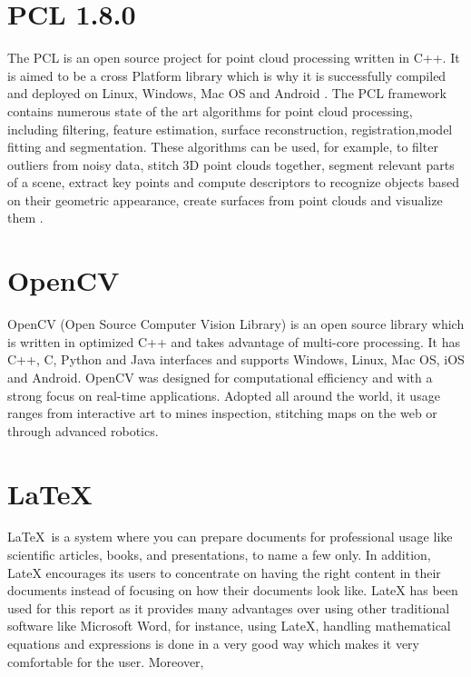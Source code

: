 \documentclass[a4paper]{report}
\begin{document}
\section{PCL 1.8.0}
The PCL is an open source project for point cloud processing written in C++. It is aimed to be a cross Platform library which is why it is successfully compiled and deployed on Linux, Windows, Mac OS and Android \cite{ref8}.
The PCL framework contains numerous state of the art algorithms for point cloud processing, including filtering, feature estimation, surface reconstruction, registration,model fitting and segmentation. These algorithms can be used, for example, to filter outliers from noisy data, stitch 3D point clouds together, segment relevant parts of a scene, extract key points and compute descriptors to recognize objects based on their geometric appearance, create surfaces from point clouds and visualize them \cite{ref9}.
\section{OpenCV}
OpenCV (Open Source Computer Vision Library) is an open source library which is written in optimized C++ and takes advantage of multi-core processing. It has C++, C, Python and Java interfaces and supports Windows, Linux, Mac OS, iOS and Android. OpenCV was designed for computational efficiency and with a strong focus on real-time applications. Adopted all around the world, it usage ranges from interactive art to mines inspection, stitching maps on the web or through advanced robotics.\cite{ref10}
\section{\LaTeX}
\LaTeX\ is a system where you can prepare documents for professional usage like scientific articles, books, and presentations, to name a few only. In addition, LateX encourages its users to concentrate on having the right content in their documents instead of focusing on how their documents look like. LateX has been used for this report as it provides many advantages over using other traditional software like Microsoft Word, for instance, using LateX, handling mathematical equations and expressions is done in a very good way which makes it very comfortable for the user. Moreover,
\end{document}

